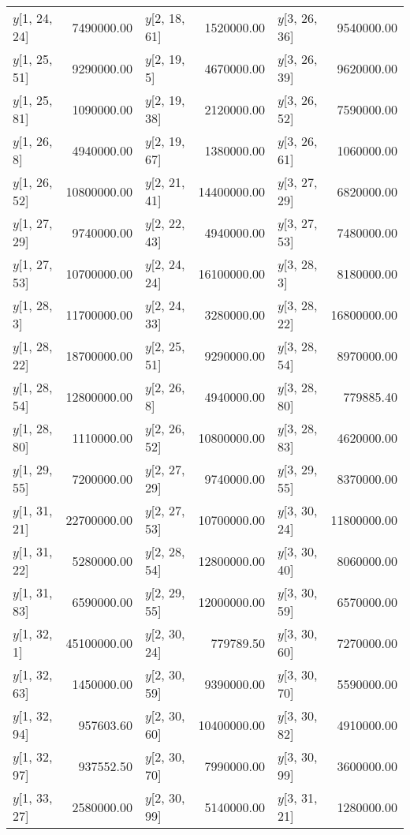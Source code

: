 \begin{longtable}{lrlrlr}
$y$[1, 24, 24] & 7490000.00 & $y$[2, 18, 61] & 1520000.00 & $y$[3, 26, 36] & 9540000.00 \\
$y$[1, 25, 51] & 9290000.00 & $y$[2, 19, 5] & 4670000.00 & $y$[3, 26, 39] & 9620000.00 \\
$y$[1, 25, 81] & 1090000.00 & $y$[2, 19, 38] & 2120000.00 & $y$[3, 26, 52] & 7590000.00 \\
$y$[1, 26, 8] & 4940000.00 & $y$[2, 19, 67] & 1380000.00 & $y$[3, 26, 61] & 1060000.00 \\
$y$[1, 26, 52] & 10800000.00 & $y$[2, 21, 41] & 14400000.00 & $y$[3, 27, 29] & 6820000.00 \\
$y$[1, 27, 29] & 9740000.00 & $y$[2, 22, 43] & 4940000.00 & $y$[3, 27, 53] & 7480000.00 \\
$y$[1, 27, 53] & 10700000.00 & $y$[2, 24, 24] & 16100000.00 & $y$[3, 28, 3] & 8180000.00 \\
$y$[1, 28, 3] & 11700000.00 & $y$[2, 24, 33] & 3280000.00 & $y$[3, 28, 22] & 16800000.00 \\
$y$[1, 28, 22] & 18700000.00 & $y$[2, 25, 51] & 9290000.00 & $y$[3, 28, 54] & 8970000.00 \\
$y$[1, 28, 54] & 12800000.00 & $y$[2, 26, 8] & 4940000.00 & $y$[3, 28, 80] & 779885.40 \\
$y$[1, 28, 80] & 1110000.00 & $y$[2, 26, 52] & 10800000.00 & $y$[3, 28, 83] & 4620000.00 \\
$y$[1, 29, 55] & 7200000.00 & $y$[2, 27, 29] & 9740000.00 & $y$[3, 29, 55] & 8370000.00 \\
$y$[1, 31, 21] & 22700000.00 & $y$[2, 27, 53] & 10700000.00 & $y$[3, 30, 24] & 11800000.00 \\
$y$[1, 31, 22] & 5280000.00 & $y$[2, 28, 54] & 12800000.00 & $y$[3, 30, 40] & 8060000.00 \\
$y$[1, 31, 83] & 6590000.00 & $y$[2, 29, 55] & 12000000.00 & $y$[3, 30, 59] & 6570000.00 \\
$y$[1, 32, 1] & 45100000.00 & $y$[2, 30, 24] & 779789.50 & $y$[3, 30, 60] & 7270000.00 \\
$y$[1, 32, 63] & 1450000.00 & $y$[2, 30, 59] & 9390000.00 & $y$[3, 30, 70] & 5590000.00 \\
$y$[1, 32, 94] & 957603.60 & $y$[2, 30, 60] & 10400000.00 & $y$[3, 30, 82] & 4910000.00 \\
$y$[1, 32, 97] & 937552.50 & $y$[2, 30, 70] & 7990000.00 & $y$[3, 30, 99] & 3600000.00 \\
$y$[1, 33, 27] & 2580000.00 & $y$[2, 30, 99] & 5140000.00 & $y$[3, 31, 21] & 1280000.00 \\

\end{longtable}
